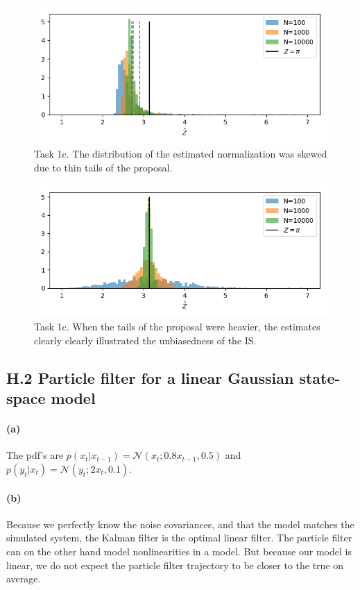 \documentclass{article}
\begin{document}
\begin{figure}[t]
	\centering
	\includegraphics[width=.7\linewidth]{1_c_hist1}
	\caption{Task 1c. The distribution of the estimated normalization was skewed due to thin tails of the proposal.}
	\label{fig:1chist1}
\end{figure}
\begin{figure}[t]
	\centering
	\includegraphics[width=.7\linewidth]{1_c_hist2}
	\caption{Task 1c. When the tails of the proposal were heavier, the estimates clearly clearly illustrated the unbiasedness of the IS.}
	\label{fig:1chist2}
\end{figure}




\cleardoublepage
\subsection*{H.2 Particle filter for a linear Gaussian state-space model}
\paragraph{(a)} The pdf's are $p(x_t|x_{t-1}) = \mathcal{N}(x_t; 0.8x_{t-1}, 0.5)$ and $ p(y_t|x_t) = \mathcal{N}(y_t;2x_t, 0.1) $.

\paragraph{(b)} Because we perfectly know the noise covariances, and that the model matches the simulated system, the Kalman filter is the optimal linear filter. The particle filter can on the other hand model nonlinearities in a model. But because our model is linear, we do not expect the particle filter trajectory to be closer to the true on average.
\end{document}
